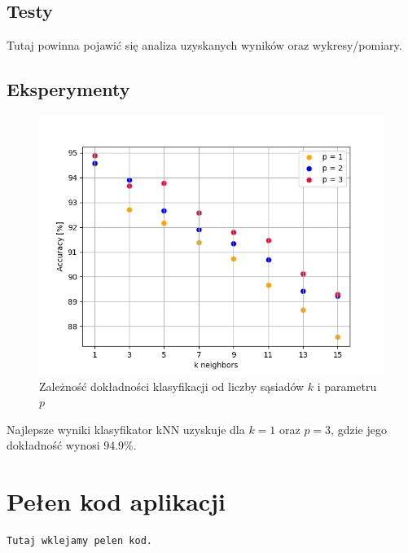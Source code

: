 \documentclass[12pt,a4paper]{article}
\begin{document}
\subsection{Testy}
Tutaj powinna pojawić się analiza uzyskanych wyników oraz wykresy/pomiary.
\subsection{Eksperymenty}
\begin{figure}[!h]
	\includegraphics[scale=1]{"knn.png"}
	\centering
	\caption{Zależność dokładności klasyfikacji od liczby sąsiadów $k$ i parametru $p$}
\end{figure}
Najlepsze wyniki klasyfikator kNN uzyskuje dla $k = 1$ oraz $p = 3$, gdzie jego dokładność wynosi 94.9\%.
\newpage
\section{Pełen kod aplikacji}
\begin{lstlisting}
Tutaj wklejamy pelen kod. 
\end{lstlisting}
\end{document}
